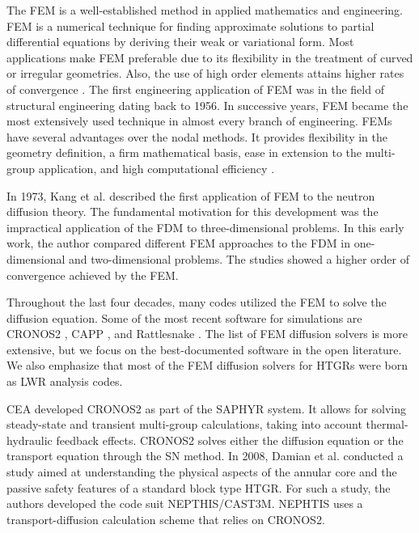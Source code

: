 The \gls{FEM} is a well-established method in applied mathematics and engineering.
\gls{FEM} is a numerical technique for finding approximate solutions to partial differential equations by deriving their weak or variational form.
Most applications make \gls{FEM} preferable due to its flexibility in the treatment of curved or irregular geometries.
Also, the use of high order elements attains higher rates of convergence \cite{cavdar_finite_2004}.
The first engineering application of \gls{FEM} was in the field of structural engineering dating back to 1956.
In successive years, \gls{FEM} became the most extensively used technique in almost every branch of engineering.
\glspl{FEM} have several advantages over the nodal methods.
It provides flexibility in the geometry definition, a firm mathematical basis, ease in extension to the multi-group application, and high computational efficiency \cite{lee_development_2008}.

In 1973, Kang et al. \cite{kang_finite_1973} described the first application of \gls{FEM} to the neutron diffusion theory.
The fundamental motivation for this development was the impractical application of the \gls{FDM} to three-dimensional problems.
In this early work, the author compared different \gls{FEM} approaches to the \gls{FDM} in one-dimensional and two-dimensional problems.
The studies showed a higher order of convergence achieved by the \gls{FEM}.

Throughout the last four decades, many codes utilized the \gls{FEM} to solve the diffusion equation.
Some of the most recent software for simulations are CRONOS2 \cite{lautard_cronos_1990}, CAPP \cite{lee_development_2011}, and Rattlesnake \cite{wang_rattlesnake_2019}.
The list of \gls{FEM} diffusion solvers is more extensive, but we focus on the best-documented software in the open literature.
We also emphasize that most of the \gls{FEM} diffusion solvers for \glspl{HTGR} were born as \gls{LWR} analysis codes.

\gls{CEA} developed CRONOS2 \cite{lautard_cronos_1990} as part of the SAPHYR system.
It allows for solving steady-state and transient multi-group calculations, taking into account thermal-hydraulic feedback effects.
CRONOS2 solves either the diffusion equation or the transport equation through the SN method.
In 2008, Damian et al. \cite{damian_vhtr_2008} conducted a study aimed at understanding the physical aspects of the annular core and the passive safety features of a standard block type \gls{HTGR}.
For such a study, the authors developed the code suit NEPTHIS/CAST3M.
NEPHTIS uses a transport-diffusion calculation scheme that relies on CRONOS2.

